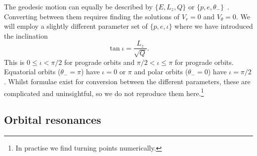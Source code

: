 \documentclass[aps,prd,amsfonts,amssymb,amsmath,nofootinbib,reprint,showpacs]{revtex4-1}
\begin{document}
The geodesic motion can equally be described by $\{E,L_z,Q\}$ or $\{p,e,\theta_-\}$~\cite{Schmidt2002}. Converting between them requires finding the solutions of $V_r = 0$ and $V_\theta = 0$. We will employ a slightly different parameter set of $\{p,e,\iota\}$ where we have introduced the inclination~\cite{Glampedakis2002}
\begin{equation}
\tan \iota = \frac{L_z}{\sqrt{Q}}.
\end{equation}
This is $0 \leq \iota < \pi/2$ for prograde orbits and $\pi/2 < \iota \leq \pi$ for prograde orbits. Equatorial orbits ($\theta_- = \pi$) have $\iota = 0$ or $\pi$ and polar orbits ($\theta_- = 0$) have $\iota = \pi/2$. Whilst formulae exist for conversion between the different parameters, these are complicated and uninsightful, so we do not reproduce them here.\footnote{In practise we find turning points numerically.}

\subsection{Orbital resonances}
\end{document}
